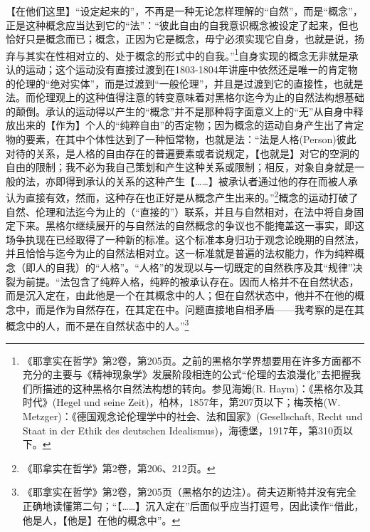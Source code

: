 【在他们这里】“设定起来的”，不再是一种无论怎样理解的“自然”，而是“概念”，正是这种概念应当达到它的“法”：“彼此自由的自我意识概念被设定了起来，但也恰好只是概念而已；概念，正因为它是概念，毋宁必须实现它自身，也就是说，扬弃与其实在性相对立的、处于概念的形式中的自我。”\footnote{《耶拿实在哲学》第2卷，第205页。之前的黑格尔学界想要用在许多方面都不充分的主要与《精神现象学》发展阶段相连的公式“伦理的去浪漫化”去把握我们所描述的这种黑格尔自然法构想的转向。参见海姆(R. Haym)：《黑格尔及其时代》(Hegel und seine Zeit)，柏林，1857年，第207页以下；梅茨格(W. Metzger)：《德国观念论伦理学中的社会、法和国家》(Gesellschaft, Recht und Staat in der Ethik des deutschen Idealismus)，海德堡，1917年，第310页以下。}自身实现的概念无非就是承认的运动；这个运动没有直接过渡到在1803-1804年讲座中依然还是唯一的肯定物的伦理的“绝对实体”，而是过渡到“一般伦理”，并且是过渡到它的直接性，也就是法。而伦理观上的这种值得注意的转变意味着对黑格尔迄今为止的自然法构想基础的颠倒。承认的运动得以产生的“概念”并不是那种将字面意义上的“无”从自身中释放出来的【作为】个人的“纯粹自由”的否定物；因为概念的运动自身产生出了肯定物的要素，在其中个体性达到了一种恒常物，也就是法：“法是人格(Person)彼此对待的关系，是人格的自由存在的普遍要素或者说规定，【也就是】对它的空洞的自由的限制；我不必为我自己策划和产生这种关系或限制；相反，对象自身就是一般的法，亦即得到承认的关系的这种产生【……】被承认者通过他的存在而被人承认为直接有效，然而，这种存在也正好是从概念产生出来的。”\footnote{《耶拿实在哲学》第2卷，第206、212页。}概念的运动打破了自然、伦理和法迄今为止的（“直接的”）联系，并且与自然相对，在法中将自身固定下来。黑格尔继续展开的与自然法的自然概念的争议也不能掩盖这一事实，即这场争执现在已经取得了一种新的标准。这个标准本身归功于观念论晚期的自然法，并且恰恰与迄今为止的自然法相对立。这一标准就是普遍的法权能力，作为纯粹概念（即人的自我）的“人格”。“人格”的发现以与一切既定的自然秩序及其“规律”决裂为前提。“法包含了纯粹人格，纯粹的被承认存在。因而人格并不在自然状态，而是沉入定在，由此他是一个在其概念中的人；但在自然状态中，他并不在他的概念中，而是作为自然存在，在其定在中。问题直接地自相矛盾——我考察的是在其概念中的人，而不是在自然状态中的人。”\footnote{《耶拿实在哲学》第2卷，第205页（黑格尔的边注）。荷夫迈斯特并没有完全正确地读懂第二句；“【……】沉入定在”后面似乎应当打逗号，因此读作“借此，他是人，【他是】在他的概念中”。}

